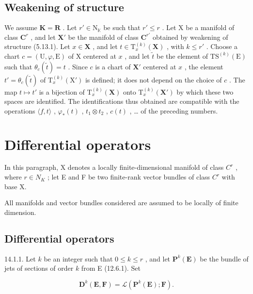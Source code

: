 \subsection{Weakening of structure}

We assume \(\mathbf{K} = \mathbf{R}\) . Let \(r' \in \mathrm{N}_{\mathbb{K}}\) be such that \(r' \leqslant r\) . Let X be a manifold of class \(\mathbf{C}^{r}\) , and let \(\mathbf{X}'\) be the manifold of class \(\mathbf{C}^{r'}\) obtained by weakening of structure (5.13.1). Let \(x \in \mathbf{X}\) , and let \(t \in \mathrm{T}_x^{(k)}(\mathbf{X})\) , with \(k \leqslant r'\) . Choose a chart \(c = (\mathrm{U}, \varphi, \mathrm{E})\) of X centered at \(x\) , and let \(\tilde{t}\) be the element of \(\mathrm{TS}^{(k)}(\mathrm{E})\) such that \(\theta_c(\tilde{t}) = t\) . Since \(c\) is a chart of \(\mathbf{X}'\) centered at \(x\) , the element \(t' = \theta_c(\tilde{t})\) of \(\mathrm{T}_x^{(k)}(\mathrm{X}')\) is defined; it does not depend on the choice of \(c\) . The map \(t \mapsto t'\) is a bijection of \(\mathrm{T}_x^{(k)}(\mathbf{X})\) onto \(\mathrm{T}_x^{(k)}(\mathbf{X}')\) by which these two spaces are identified. The identifications thus obtained are compatible with the operations \(\langle f, t \rangle\) , \(\varphi_*(t)\) , \(t_1 \otimes t_2\) , \(c(t)\) , \ldots{} of the preceding numbers.

\section{Differential operators}

In this paragraph, X denotes a locally finite-dimensional manifold of class \(C^{r}\) , where \(r \in N_{K}\) ; let E and F be two finite-rank vector bundles of class \(C^{r}\) with base X.

All manifolds and vector bundles considered are assumed to be locally of finite dimension.

\subsection{Differential operators}

14.1.1. Let \(k\) be an integer such that \(0 \leqslant k \leqslant r\) , and let \(\mathbf{P}^k(\mathbf{E})\) be the bundle of jets of sections of order \(k\) from E (12.6.1). Set

\[
\mathbf {D} ^ {k} (\mathbf {E}, \mathbf {F}) = \mathscr {L} (\mathbf {P} ^ {k} (\mathbf {E}); \mathbf {F}).
\]

